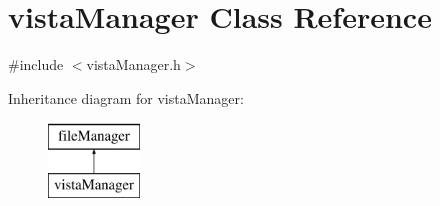 \hypertarget{classvistaManager}{\section{vista\-Manager \-Class \-Reference}
\label{classvistaManager}
}


{\ttfamily \#include $<$vista\-Manager.\-h$>$}

\-Inheritance diagram for vista\-Manager\-:\begin{figure}[H]
\begin{center}
\leavevmode
\includegraphics[height=2.000000cm]{classvistaManager}
\end{center}
\end{figure}
